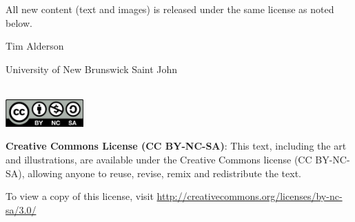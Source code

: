 \bigskip

\noindent All new content (text and images) is released under the same license as noted below.

\vspace{5em}

\noindent Tim Alderson

\noindent University of New Brunswick Saint John

\vfill


 \\

\noindent \includegraphics[width=3cm]{images/cc-by-nc-sa.eps}

\medskip

\noindent \textbf{Creative Commons License (CC BY-NC-SA)}: This text, including the art and illustrations, are available under the Creative Commons license (CC BY-NC-SA), allowing anyone to reuse, revise, remix and redistribute the text.  

\medskip

\noindent To view a copy of this license,
visit \href{http://creativecommons.org/licenses/by-nc-sa/3.0/}{http://creativecommons.org/licenses/by-nc-sa/3.0/}  

\setlength{\parskip}{\baselineskip}